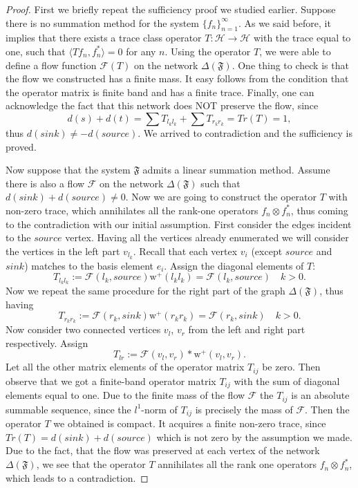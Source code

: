 \documentclass[12pt]{article}
\renewcommand{\cal}[1]{\mathcal{#1}}
\newcommand\inner[2]{\langle #1, #2 \rangle}
\theoremstyle{definition}
\newcommand{\seq}[1]{\{{#1}_n\}_{n=1}^\infty}
\newcommand{\fsys}{\mathfrak{F}}
\newcommand{\wtp}{\mathrm{w}^{+}}
\newcommand{\flow}{\mathcal{F}}
\newcommand{\flowsgn}{\flow}
\newcommand{\source}{\mathit{source}}
\newcommand{\sink}{\mathit{sink}}
\newcommand{\net}{\Delta}
\numberwithin{remark}{section}
\numberwithin{theorem}{section}
\numberwithin{prop}{section}
\numberwithin{equation}{section}
\numberwithin{lemma}{section}
\numberwithin{prop_under_lemma}{lemma}
\begin{document}
    \begin{proof}
      First we briefly repeat the sufficiency proof we studied earlier.
      Suppose there is no summation method for the system $\seq{f}$.
      As we said before, it implies that there exists a trace class operator $T : \cal{H} \to \cal{H}$ with
      the trace equal to one, such that $\inner{Tf_n}{f_n^*} = 0$ for any $n$.
      Using the operator $T$, we were able to define a flow function $\flow(T)$ on the network
      $\net(\fsys)$.
      One thing to check is that the flow we constructed has a finite mass.
      It easy follows from the condition that the operator matrix is finite band and has a finite trace.
      Finally, one can acknowledge the fact that this network does NOT preserve the flow, since
      $$
        d(s) + d(t) = \sum T_{l_k l_k} + \sum T_{r_k r_k} = Tr(T) = 1,
      $$
      thus $d(\sink) \neq -d(\source)$.
      We arrived to contradiction and the sufficiency is proved.

      Now suppose that the system $\fsys$ admits a linear summation method.
      Assume there is also a flow $\flow$ on the network $\net(\fsys)$ such that $d(\sink) + d(\source) \neq 0$.
      Now we are going to construct the operator $T$ with non-zero trace, which annihilates all the rank-one
      operators $f_n \otimes f^*_n$, thus coming to the contradiction with our initial assumption.
      First consider the edges incident to the $\source$ vertex.
      Having all the vertices already enumerated we will consider the vertices in the left part $v_{l_k}$.
      Recall that each vertex $v_i$ (except $\source$ and $\sink$) matches to the basis element $e_i$.
      Assign the diagonal elements of $T$:
      $$
        T_{l_k l_k} := \flow(l_k, \source) \wtp(l_k l_k) = \flow(l_k, \source) \quad k > 0.
      $$
      Now we repeat the same procedure for the right part of the graph $\net(\fsys)$, thus having
      $$
        T_{r_k r_k} := \flow(r_k, \sink) \wtp(r_k r_k) = \flow(r_k, \sink) \quad k > 0.
      $$
      Now consider two connected vertices $v_l$, $v_r$ from the left and right part
      respectively. Assign
      $$
        T_{lr} := \flowsgn(v_l, v_r) * \wtp(v_l, v_r).
      $$
      Let all the other matrix elements of the operator matrix $T_{ij}$ be zero.
      Then observe that we got a finite-band operator matrix $T_{ij}$ with the sum of diagonal elements
      equal to one.
      Due to the finite mass of the flow $\flow$ the $T_{ij}$ is an absolute summable sequence, since the 
        $l^1$-norm of $T_{ij}$ is precisely the mass of $\flow$.
      Then the operator $T$ we obtained is compact.
      It acquires a finite non-zero trace, since $Tr(T) = d(\sink) + d(\source)$ which is not zero
        by the assumption we made.
      Due to the fact, that the flow was preserved at each vertex of the network $\net(\fsys)$,
        we see that the operator $T$ annihilates all the rank one operators $f_n \otimes f^*_n$,
        which leads to a contradiction.
    \end{proof}
    
\end{document}

